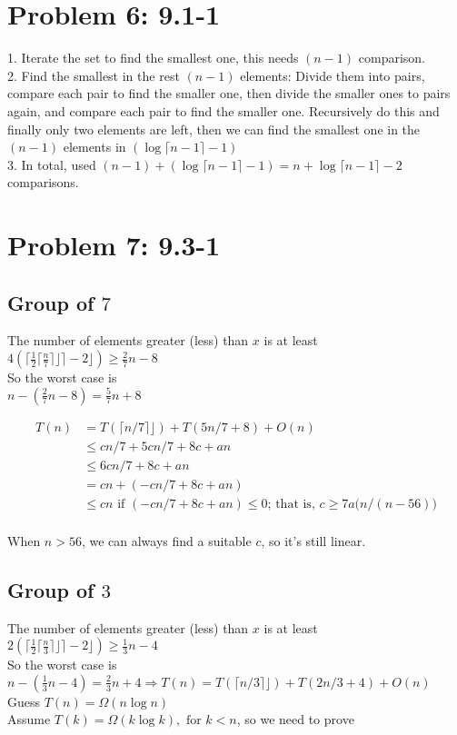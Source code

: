 \documentclass[a4paper]{article}
\begin{document}
\section{Problem 6: 9.1-1}

1. Iterate the set to find the smallest one, this needs $(n-1)$ comparison.\\
2. Find the smallest in the rest $(n-1)$ elements: Divide them into pairs, compare each pair to find the smaller one, then divide the smaller ones to pairs again, and compare each pair to find the smaller one. Recursively do this and finally only two elements are left, then we can find the smallest one in the $(n-1)$ elements in $(\log {\lceil{n-1}\rceil} - 1)$\\
3. In total, used $(n-1) + (\log {\lceil{n-1}\rceil} - 1)=n+\log {\lceil{n-1}\rceil}-2$ comparisons.

\section{Problem 7: 9.3-1} 

\subsection{Group of $7$}
The number of elements greater (less) than $x$ is at least\\
$4(\bigl\lceil \frac{1}{2}\lceil{\frac{n}{7}}\rceil⌋\bigr\rceil-2⌋)\geq \frac{2}{7}n-8$\\
So the worst case is\\
$n-(\frac{2}{7}n-8)=\frac{5}{7}n+8$

\begin{align*}
    T(n) & = T(\lceil{n/7}\rceil⌋)+T(5n/7+8) + O(n) \\
    & \leq cn/7+5cn/7+8c + an \\
    & \leq 6cn/7+8c + an \\
    & = cn + (-cn/7+8c+an)\\
    & \leq cn \text{ if } (-cn/7+8c+an)\leq0 \text{; that is, } c\geq 7a\bigl(n/(n-56)\bigr) \\
\end{align*}

When $n>56$, we can always find a suitable $c$, so it's still linear.

\subsection{Group of $3$}
The number of elements greater (less) than $x$ is at least\\
$2(\bigl\lceil \frac{1}{2}\lceil{\frac{n}{3}}\rceil⌋\bigr\rceil-2⌋)\geq \frac{1}{3}n-4$\\
So the worst case is\\
$n-(\frac{1}{3}n-4)=\frac{2}{3}n+4\Rightarrow T(n) = T(\lceil{n/3}\rceil⌋)+T(2n/3+4) + O(n)$\\
Guess $T(n)=\Omega(n\log n)$\\
Assume $T(k)=\Omega(k\log k), \text{ for } k<n$, so we need to prove
\end{document}
